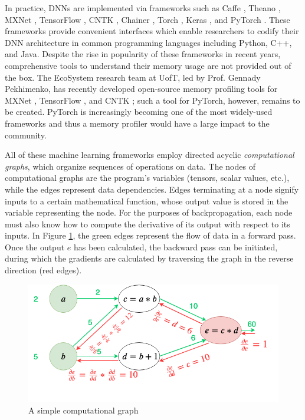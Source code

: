 \documentclass[12pt,letterpaper]{article}
\begin{document}
\label{sec:Machine_Learning_Frameworks_and_Memory_Profiler}
In practice, DNNs are implemented via frameworks such as  Caffe \cite{caffe}, Theano \cite{theano}, MXNet \cite{mxnet_paper}, TensorFlow \cite{tensorflow}, CNTK \cite{cntk}, Chainer \cite{chainer}, Torch \cite{torch}, Keras \cite{keras}, and PyTorch \cite{pytorch_paper}. These frameworks provide convenient interfaces which enable researchers to codify their DNN architecture in common programming languages including Python, C++, and Java. Despite the rise in popularity of these frameworks in recent years, comprehensive tools to understand their memory usage are not provided out of the box. The EcoSystem research team at UofT, led by Prof. Gennady Pekhimenko, has recently developed open-source memory profiling tools for MXNet \cite{mxnet_paper}, TensorFlow \cite{tensorflow}, and CNTK \cite{cntk}; such a tool for PyTorch, however, remains to be created. PyTorch is increasingly becoming one of the most widely-used frameworks and thus a memory profiler would have a large impact to the community.
\par

All of these machine learning frameworks employ directed acyclic \textit{computational graphs}, which organize sequences of operations on data. The nodes of computational graphs are the program's variables (tensors, scalar values, etc.), while the edges represent data dependencies. Edges terminating at a node signify inputs to a certain mathematical function, whose output value is stored in the variable representing the node. For the purposes of backpropagation, each node must also know how to compute the derivative of its output with respect to its inputs. In Figure \ref{fig:computational_graph}, the green edges represent the flow of data in a forward pass. Once the output $e$ has been calculated, the backward pass can be initiated, during which the gradients are calculated by traversing the graph in the reverse direction (red edges).
\par 

\begin{figure}[ht]
\centering
\includegraphics[width=.7\textwidth]{computational_graph_example.png}
\captionsetup{width=0.7\linewidth}
\caption{A simple computational graph \cite{computational_graph_example}}
\label{fig:computational_graph}
\end{figure}
\end{document}
